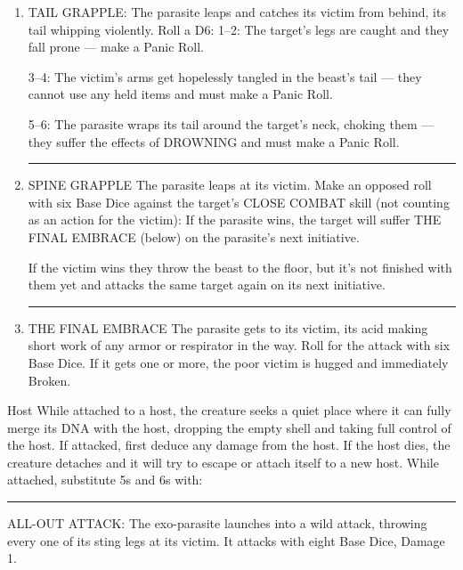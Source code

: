 \begin{rpg-commentbox}{}
\begin{small}
\begin{enumerate}
        \item TAIL GRAPPLE: The parasite leaps and catches its victim from behind, its tail whipping
        violently. Roll a D6:
            1–2: The target’s legs are caught and they fall prone — make a Panic Roll.
            
            3–4: The victim’s arms get hopelessly tangled in the beast’s tail — they cannot use any held items and must make a Panic Roll.
            
            5–6: The parasite wraps its tail around the target’s neck, choking them — they suffer the effects of DROWNING and must make a Panic Roll. 

        \par\noindent\rule{.9\textwidth}{0.4pt}

        \item SPINE GRAPPLE The parasite leaps at its victim. Make an opposed roll with six Base Dice
        against the target’s CLOSE COMBAT skill (not counting as an action for the victim):
            If the parasite wins, the target will suffer THE FINAL EMBRACE (below) on the parasite's next initiative.

            If the victim wins they throw the beast to the floor, but it’s not finished with them
        yet and attacks the same target again on its next initiative. 

        \par\noindent\rule{.9\textwidth}{0.4pt}

        \item THE FINAL EMBRACE The parasite gets to its victim, its acid making short work of any armor or respirator in the way. Roll for the attack with six Base Dice. If it gets one or more, the poor victim is hugged and immediately Broken.
    \end{enumerate}
    \end{small}

\end{rpg-commentbox}

\begin{rpg-commentbox}{Host}
    While attached to a host, the creature seeks a quiet place where it can fully merge its DNA with the host, dropping the empty shell and taking full control of the host. If attacked, first deduce any damage from the host. If the host dies, the creature detaches and it will try to escape or attach itself to a new host.
    While attached, substitute 5s and 6s with:

    \par\noindent\rule{.9\textwidth}{0.4pt}

    ALL-OUT ATTACK: The exo-parasite launches into a wild attack, throwing every one of its sting legs at its victim. It attacks with eight Base Dice, Damage 1.

\end{rpg-commentbox} 


